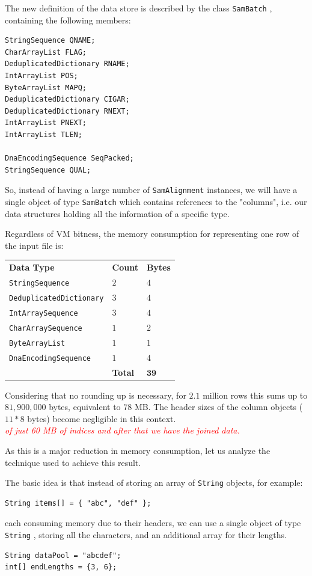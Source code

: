 \documentclass[a4paper,twoside]{article}
\begin{document}
The new definition of the data store is described by the class {\texttt{SamBatch} }, containing the following members:
\begin{small}
\begin{verbatim}
StringSequence QNAME;
CharArrayList FLAG;
DeduplicatedDictionary RNAME;
IntArrayList POS;
ByteArrayList MAPQ;
DeduplicatedDictionary CIGAR;
DeduplicatedDictionary RNEXT;
IntArrayList PNEXT;
IntArrayList TLEN;

DnaEncodingSequence SeqPacked;
StringSequence QUAL;
\end{verbatim}
\end{small}

So, instead of having a large number of {\texttt{SamAlignment} } instances, we will have a single object of type {\texttt{SamBatch} } which contains references to the "columns", i.e. our data structures holding all the information of a specific type.


Regardless of VM bitness, the memory consumption for representing one row of the input file is: 
\begin{center}
\begin{tabular}{ l l l }
 {\textbf{Data Type} } 				& {\textbf{Count} } 		& {\textbf{Bytes} } \\
 {\texttt{StringSequence} } 			& $2$ 				& $4$ \\
 {\texttt{DeduplicatedDictionary} }	& $3$ 				& $4$ \\
 {\texttt{IntArraySequence} }			& $3$		 		& $4$ \\
 {\texttt{CharArraySequence} }		& $1$				& $2$ \\
 {\texttt{ByteArrayList} }			& $1$				& $1$ \\
 {\texttt{DnaEncodingSequence} }	 	& $1$ 				& $4$ \\
 								& {\textbf{Total} }		& $\mathbf{39}$
\end{tabular}
\end{center}

Considering that no rounding up is necessary, for $2.1$ million rows this sums up to $81,900,000$ bytes,
equivalent to $78$ MB. The header sizes of the column objects ($11*8$ bytes) become negligible in this context.
\\ \textcolor{red}{{\textit{of just 60 MB of indices and after that we have the joined data.} }}

As this is a major reduction in memory consumption, let us analyze the technique used to achieve this result.

The basic idea is that instead of storing an array of {\texttt{String} } objects, for example:
\begin{verbatim}
String items[] = { "abc", "def" };
\end{verbatim}
each consuming memory due to their headers, we can use 
a single object of type {\texttt{String} }, storing all the characters, and an additional array for their lengths.
\begin{verbatim}
String dataPool = "abcdef";
int[] endLengths = {3, 6};
\end{verbatim}
\end{document}
